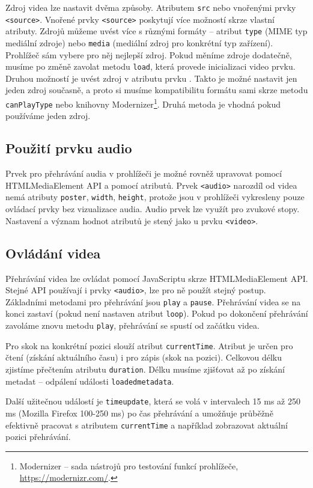 Zdroj videa lze nastavit dvěma způsoby. Atributem \texttt{src} nebo vnořenými prvky \texttt{<source>}. Vnořené prvky \texttt{<source>} poskytují více možností skrze vlastní atributy. Zdrojů můžeme uvést více s různými formáty -- atribut \texttt{type} (MIME typ mediální zdroje) nebo \texttt{media} (mediální zdroj pro konkrétní typ zařízení). Prohlížeč sám vybere pro něj nejlepší zdroj. Pokud měníme zdroje dodatečně, musíme po změně zavolat metodu \texttt{load}, která provede inicializaci video prvku. Druhou možností je uvést zdroj v atributu  prvku . Takto je možné nastavit jen jeden zdroj současně, a proto si musíme kompatibilitu formátu sami skrze metodu \texttt{canPlayType} nebo knihovny Modernizer\footnote{Modernizer -- sada nástrojů pro testování funkcí prohlížeče, \url{https://modernizr.com/}.}. Druhá metoda je vhodná pokud používáme jeden zdroj.

\subsection{Použití prvku audio}
Prvek pro přehrávání audia v prohlížeči je možné rovněž upravovat pomocí HTMLMediaElement API a pomocí atributů. Prvek \texttt{<audio>} narozdíl od videa nemá atributy \texttt{poster}, \texttt{width}, \texttt{height}, protože jsou v prohlížeči vykresleny pouze ovládací prvky bez vizualizace audia. Audio prvek lze využít pro zvukové stopy. Nastavení a význam hodnot atributů je stený jako u prvku \texttt{<video>}.

\subsection{Ovládání videa}
Přehrávání videa lze ovládat pomocí JavaScriptu skrze HTMLMediaElement API. Stejné API používají i prvky \texttt{<audio>}, lze pro ně použít stejný postup. Základními metodami pro přehrávání jsou \texttt{play} a \texttt{pause}. Přehrávání videa se na konci zastaví (pokud není nastaven atribut \texttt{loop}). Pokud po dokončení přehrávání zavoláme znovu metodu \texttt{play}, přehrávání se spustí od začátku videa.

Pro skok na konkrétní pozici slouží atribut \texttt{currentTime}. Atribut je určen pro čtení (získání aktuálního času) i pro zápis (skok na pozici). Celkovou délku zjistíme přečtením atributu \texttt{duration}. Délku musíme zjišťovat až po získání metadat -- odpálení události \texttt{loadedmetadata}.

Další užitečnou událostí je \texttt{timeupdate}, která se volá v intervalech 15 ms až 250 ms (Mozilla Firefox 100-250 ms) po čas přehrávání a umožňuje průběžně efektivně pracovat s atributem \texttt{currentTime} a například zobrazovat aktuální pozici přehrávání.


